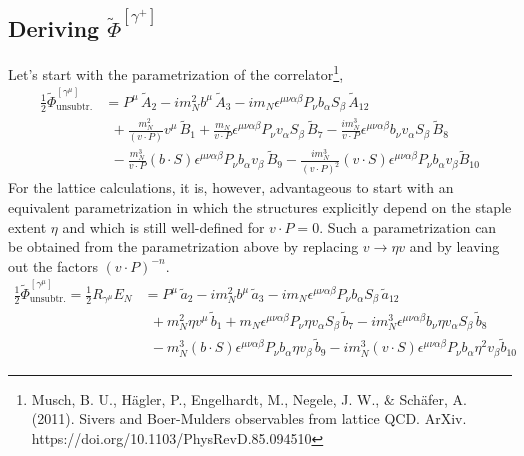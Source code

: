 \documentclass[]{article}
\numberwithin{equation}{section}
\newcommand{\tcdot}{{\cdot}}
\newcommand{\tAmp}{\widetilde{A}}
\newcommand{\tBmp}{\widetilde{B}}
\newcommand{\bvec}{b}
\newcommand{\mN}{m_N}
\newcommand{\unsub}{\text{unsubtr.}}
\begin{document}
\subsection{Deriving $\widetilde \Phi^{[\gamma^+]}$}
Let's start with the parametrization of the correlator\footnote{Musch, B. U., Hägler, P., Engelhardt, M., Negele, J. W., $\&$ Schäfer, A. (2011). Sivers and Boer-Mulders observables from lattice QCD. ArXiv. https://doi.org/10.1103/PhysRevD.85.094510},
\begin{align}
    \frac{1}{2}\widetilde \Phi^{[\gamma^\mu]}_{\unsub} & = 
		P^\mu\, \tAmp_2 - i \mN^2 \bvec^\mu\, \tAmp_3
		- i \mN \epsilon^{\mu \nu \alpha \beta} P_\nu \bvec_\alpha S_\beta\, \tAmp_{12} \nonumber \\ &
		~~+ \frac{\mN^2}{(v \tcdot P)} v^\mu\, \tBmp_1 
		+ \frac{\mN}{v \tcdot P} \epsilon^{\mu \nu \alpha \beta} P_\nu v_\alpha S_\beta\, \tBmp_7  
		- \frac{ i \mN^3}{v \tcdot P} \epsilon^{\mu \nu \alpha \beta} \bvec_\nu v_\alpha S_\beta\, \tBmp_8 \nonumber \\ &
		~~- \frac{\mN^3}{v \tcdot P} (\bvec \tcdot S) \epsilon^{\mu \nu \alpha \beta} P_\nu \bvec_\alpha v_\beta\, \tBmp_9
		- \frac{i \mN^3}{(v \tcdot P)^2} (v \tcdot S) \epsilon^{\mu \nu \alpha \beta} P_\nu \bvec_\alpha v_\beta \tBmp_{10}
\end{align}
 For the lattice calculations, it is, however, advantageous to start with an equivalent parametrization in which the structures explicitly depend on the staple extent $\eta$ and which is still well-defined for $ v\cdot P = 0$. Such a parametrization can be obtained from the parametrization above by replacing $v \rightarrow \eta v$ and by leaving out the factors $(v \tcdot P)^{-n}$. 
 \begin{align}
    \frac{1}{2}\widetilde \Phi^{[\gamma^\mu]}_{\unsub}=\frac{1}{2} R_{\gamma^{\mu}} E_N & =  
		P^\mu\, \tilde a_2 - i \mN^2 \bvec^\mu\, \tilde a_3
		- i \mN \epsilon^{\mu \nu \alpha \beta} P_\nu \bvec_\alpha S_\beta\, \tilde a_{12} \nonumber \\ &
		~~+ \mN^2 \eta v^\mu\, \tilde b_1 
		+ \mN \epsilon^{\mu \nu \alpha \beta} P_\nu \eta v_\alpha S_\beta\, \tilde b_7  
		-  i \mN^3 \epsilon^{\mu \nu \alpha \beta} \bvec_\nu \eta v_\alpha S_\beta\, \tilde b_8 \nonumber \\ &
		~~- \mN^3 (\bvec \tcdot S) \epsilon^{\mu \nu \alpha \beta} P_\nu \bvec_\alpha \eta v_\beta\, \tilde b_9
		-i \mN^3 (v \tcdot S) \epsilon^{\mu \nu \alpha \beta} P_\nu \bvec_\alpha \eta^2 v_\beta \tilde b_{10}
\end{align}
\end{document}
